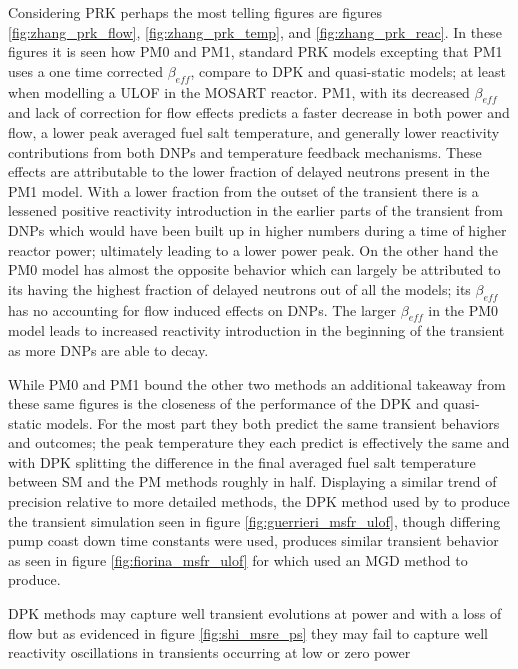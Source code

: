 \documentclass[review]{elsarticle}
\begin{document}
\par Considering PRK perhaps the most telling figures are figures
\ref{fig:zhang_prk_flow}, \ref{fig:zhang_prk_temp}, and 
\ref{fig:zhang_prk_reac}. In these figures it is seen how PM0 and PM1,
standard PRK models excepting that PM1 uses a one time corrected $\beta_{eff}$,
compare to DPK and quasi-static models; at least when modelling a ULOF in
the MOSART reactor. PM1, with its decreased $\beta_{eff}$ and lack of correction
for flow effects predicts a faster decrease in both power and flow, a lower
peak averaged fuel salt temperature, and generally lower reactivity
contributions from both DNPs and temperature feedback mechanisms. These
effects are attributable to the lower fraction of delayed neutrons present
in the PM1 model. With a lower fraction from the outset of the transient there
is a lessened positive reactivity introduction in the earlier parts of the
transient from DNPs which would have been built up in higher numbers during
a time of higher reactor power; ultimately leading to a lower power peak.
On the other hand the PM0 model has almost
the opposite behavior which can largely be attributed to its having the
highest fraction of delayed neutrons out of all the models; its $\beta_{eff}$
has no accounting for flow induced effects on DNPs. The larger
$\beta_{eff}$ in the PM0 model leads to increased reactivity introduction
in the beginning of the transient as more DNPs are able to decay.
\par While PM0 and PM1 bound the other two methods an additional takeaway from
these same figures is the closeness of the performance of the DPK and
quasi-static models. For the most part they both predict the same transient
behaviors and outcomes; the peak temperature they each predict is effectively
the same and with DPK splitting the difference in the final averaged fuel salt
temperature between SM and the PM methods roughly in half. Displaying
a similar trend of precision relative to more detailed methods, the DPK method
 used by \cite{guerrieri_investigation_2013} to produce
the transient simulation seen in figure \ref{fig:guerrieri_msfr_ulof}, though
differing pump coast down time constants were used, produces similar transient
behavior as seen in figure \ref{fig:fiorina_msfr_ulof} for which
\cite{fiorina_modelling_2014} used an MGD method to produce.
\par DPK methods may capture well transient evolutions at power and with a loss
of flow but as evidenced in figure \ref{fig:shi_msre_ps} they may fail to
capture well reactivity oscillations in transients occurring at low or zero power
\end{document}

